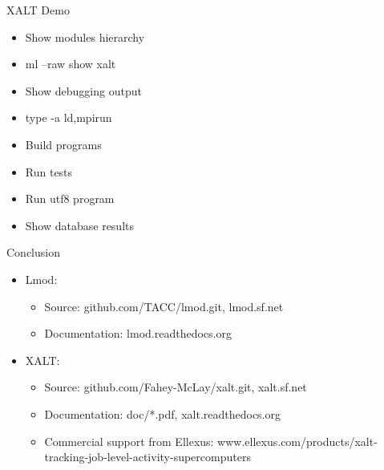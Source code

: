 \documentclass{beamer}
\begin{document}
\begin{frame}{XALT Demo}
  \begin{itemize}
    \item Show modules hierarchy
    \item ml --raw show xalt
    \item Show debugging output
    \item type -a {ld,mpirun}
    \item Build programs
    \item Run tests
    \item Run utf8 program
    \item Show database results
  \end{itemize}
\end{frame}

\begin{frame}{Conclusion}
  \begin{itemize}
    \item Lmod:
      \begin{itemize}
        \item Source: github.com/TACC/lmod.git, lmod.sf.net
        \item Documentation: lmod.readthedocs.org
      \end{itemize}
    \item XALT:
      \begin{itemize}
        \item Source: github.com/Fahey-McLay/xalt.git, xalt.sf.net
        \item Documentation: doc/*.pdf, xalt.readthedocs.org
        \item Commercial support from Ellexus: www.ellexus.com/products/xalt-tracking-job-level-activity-supercomputers
      \end{itemize}
  \end{itemize}
\end{frame}
\end{document}
